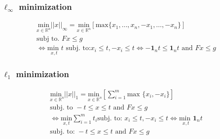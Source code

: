 \subsubsection{$\ell_\infty$ minimization}
\begin{gather*}
    \underset{x\in\mathbb{R}^n}{\textrm{min}}||x||_\infty = \underset{x\in \mathbb{R}^n}{\textrm{min}}[\textrm{max}\{x_1,\dotsc,x_n, -x_1,\dotsc, -x_n\}] \\ \textrm{subj to. } Fx \leq g \\
    \Leftrightarrow \underset{x,t}{\textrm{min }} t \textrm{ subj. to:} x_i\leq t , -x_i \leq t \Leftrightarrow -\mathbf{1}_nt \leq \mathbf{1}_n t \textrm{ and } Fx \leq g 
\end{gather*}
\subsubsection{$\ell_1$ minimization}
\begin{gather*}
    \underset{x \in \mathbb{R}^n}{\textrm{min }}||x||_1=\underset{x \in \mathbb{R}^n}{\textrm{min }}[\sum^m_{i=1}\textrm{max }\{x_i, -x_i\}]\\ \textrm{subj. to } -t \leq x \leq t \textrm{ and } F x \leq g\\ 
    \Leftrightarrow \underset{x,t}{\textrm{min}} \sum ^m_{i = 1} t_i \textrm{subj. to: } x_i \leq t , -x_i \leq t \Leftrightarrow \underset{x,t}{\textrm{min }} \mathbf{1}_n t\\ \textrm{subj. to: } -t \leq x \leq t \textrm{ and } Fx \leq g
\end{gather*}
\vfill\null\columnbreak
